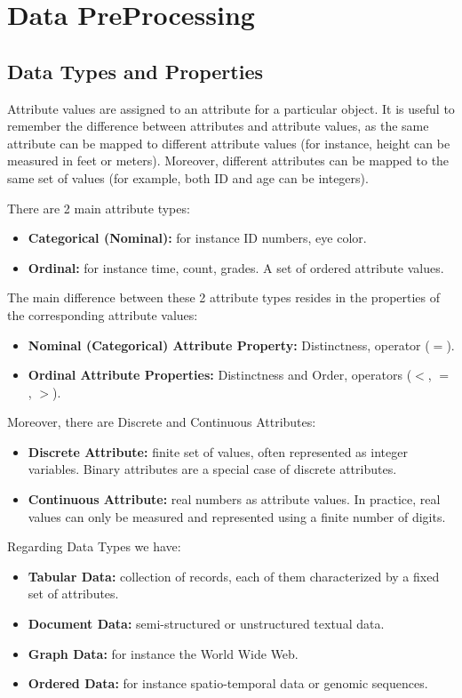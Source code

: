 \chapter{Data PreProcessing}

\section{Data Types and Properties}
Attribute values are assigned to an attribute for a particular object. It is useful to remember the difference between attributes and attribute values, as the same attribute can be mapped to different attribute values (for instance, height can be measured in feet or meters). Moreover, different attributes can be mapped to the same set of values (for example, both ID and age can be integers).

There are 2 main attribute types:
\begin{itemize}
    \item \textbf{Categorical (Nominal):} for instance ID numbers, eye color.
    \item \textbf{Ordinal:} for instance time, count, grades. A set of ordered attribute values.
\end{itemize}

The main difference between these 2 attribute types resides in the properties of the corresponding attribute values:
\begin{itemize}
    \item \textbf{Nominal (Categorical) Attribute Property:} Distinctness, operator ($=$).
    \item \textbf{Ordinal Attribute Properties:} Distinctness and Order, operators ($<$, $=$, $>$).
\end{itemize}

Moreover, there are Discrete and Continuous Attributes:
\begin{itemize}
    \item \textbf{Discrete Attribute:} finite set of values, often represented as integer variables. Binary attributes are a special case of discrete attributes.
    \item \textbf{Continuous Attribute:} real numbers as attribute values. In practice, real values can only be measured and represented using a finite number of digits.
\end{itemize}

Regarding Data Types we have:
\begin{itemize}
    \item \textbf{Tabular Data:} collection of records, each of them characterized by a fixed set of attributes.
    \item \textbf{Document Data:} semi-structured or unstructured textual data.
    \item \textbf{Graph Data:} for instance the World Wide Web.
    \item \textbf{Ordered Data:} for instance spatio-temporal data or genomic sequences.
\end{itemize}

